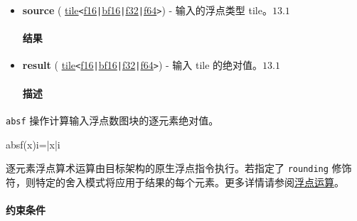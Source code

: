 \documentclass{article}
\begin{document}
\begin{itemize}
\item \textbf{source} ( \href{https://docs.nvidia.com/cuda/tile-ir/latest/sections/types.html#type-tile}{tile}\texttt{<}\href{https://docs.nvidia.com/cuda/tile-ir/latest/sections/types.html#subsection-element-types}{f16}\texttt{|}\href{https://docs.nvidia.com/cuda/tile-ir/latest/sections/types.html#subsection-element-types}{bf16}\texttt{|}\href{https://docs.nvidia.com/cuda/tile-ir/latest/sections/types.html#subsection-element-types}{f32}\texttt{|}\href{https://docs.nvidia.com/cuda/tile-ir/latest/sections/types.html#subsection-element-types}{f64}\texttt{>}) - 输入的浮点类型 tile。$\boxed{13.1}$




\paragraph{结果}


\item \textbf{result} ( \href{https://docs.nvidia.com/cuda/tile-ir/latest/sections/types.html#type-tile}{tile}\texttt{<}\href{https://docs.nvidia.com/cuda/tile-ir/latest/sections/types.html#subsection-element-types}{f16}\texttt{|}\href{https://docs.nvidia.com/cuda/tile-ir/latest/sections/types.html#subsection-element-types}{bf16}\texttt{|}\href{https://docs.nvidia.com/cuda/tile-ir/latest/sections/types.html#subsection-element-types}{f32}\texttt{|}\href{https://docs.nvidia.com/cuda/tile-ir/latest/sections/types.html#subsection-element-types}{f64}\texttt{>}) - 输入 tile 的绝对值。$\boxed{13.1}$




\paragraph{描述}


\end{itemize}
\texttt{absf} 操作计算输入浮点数图块的逐元素绝对值。



absf(x)i=|x|i


逐元素浮点算术运算由目标架构的原生浮点指令执行。若指定了 \texttt{rounding} 修饰符，则特定的舍入模式将应用于结果的每个元素。更多详情请参阅\href{https://docs.nvidia.com/cuda/tile-ir/latest/sections/operations.html#op-group-floating-point}{浮点运算}。





\paragraph{约束条件}
\end{document}
